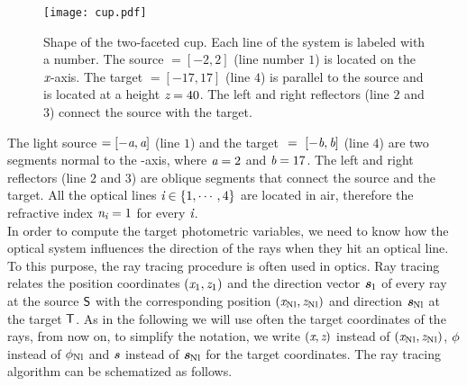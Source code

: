 \begin{figure}[h]
\label{fig:cup}
  \begin{center}
\vspace{-1.5cm}
  \texttt{[image: cup.pdf]}
  \end{center}
\vspace{-2cm}
  \caption{\footnotesize{Shape of the two-faceted cup.  Each line of the system is labeled with a number.
   The source $= [-2,2]$ (line number $1$) is located on the $\textit{x}$-axis.
   The target $= [-17, 17]$ (line $4$) is parallel to the source and is located at a height $\textit{z}= 40$.
   The left and right reflectors (line $2$ and $3$) connect the source with the target.}}
  \label{fig:cup}
\end{figure}
The light source $= [-\textit{a}, \textit{a}]$ (line $1$) and the target $~=~ [-\textit{b}, \textit{b}]$ (line $4$) are two segments normal to the -axis, where $\textit{a}=2$ and $\textit{b}=17$.
The left and right reflectors (line $2$ and $3$) are oblique segments that connect the source and the target.
All the optical lines $\textit{i} \in \{1, \cdots, 4\}$  are located in air, therefore the refractive index $\textit{n}_{\textit{i}}=1$ for every $\textit{i}$. \\ \indent
In order to compute the target photometric variables, we need to know how the optical system influences the direction of the rays when they hit an optical line.
 To this purpose, the ray tracing procedure is often used in optics.
Ray tracing relates the position coordinates
 $ (\textit{x}_1, \textit{z}_1)$ and the direction vector $\textit{\textbf{s}}_1$ of every ray at the source $\textsf{S}$ with the corresponding position $(\textit{x}_{\textrm{Nl}}, \textit{z}_{\textrm{Nl}})$ and direction $\textit{\textbf{s}}_{\textrm{Nl}}$
 at the target $\textsf{T}$. As in the following we will use often the target coordinates of the rays, from now on, to simplify the notation, we write $(\textit{x},\textit{z})$ instead of $(\textit{x}_{\textrm{Nl}}, \textit{z}_{\textrm{Nl}})$,  $\phi$ instead of $\phi_{\textrm{Nl}}$ and $\textit{\textbf{s}}$ instead of $\textit{\textbf{s}}_{\textrm{Nl}}$ for the target coordinates. 
The ray tracing algorithm can be schematized as follows.
